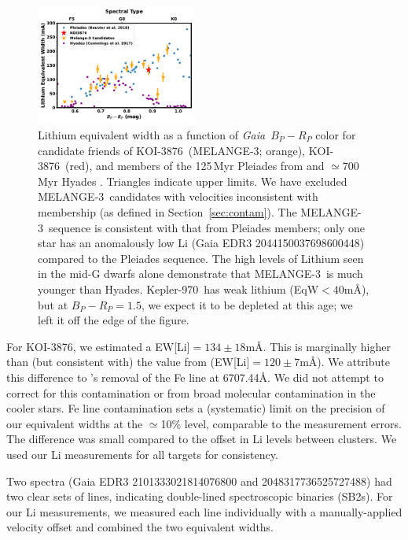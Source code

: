 \documentclass[twocolumn, linenumbers]{aastex631}
\newcommand{\association}{MELANGE-3}
\newcommand{\starname}{KOI-3876}
\newcommand{\starnametwo}{Kepler-970}
\newcommand{\gaia}{\textit{Gaia}}
\begin{document}
\begin{figure}[!t]
    \centering
    \includegraphics[width=0.47\textwidth]{lithium.pdf}
    \caption{Lithium equivalent width as a function of \gaia\ $B_P-R_P$ color for candidate friends of \starname\ (\association; orange), \starname\ (red), and members of the 125\,Myr Pleiades from \citet{2018A&A...613A..63B} and $\simeq$700\,Myr Hyades \citep{2017AJ....153..128C}. Triangles indicate upper limits. We have excluded \association\ candidates with velocities inconsistent with membership (as defined in Section~\ref{sec:contam}). The \association\ sequence is consistent with that from Pleiades members; only one star has an anomalously low Li (Gaia EDR3 2044150037698600448) compared to the Pleiades sequence. The high levels of Lithium seen in the mid-G dwarfs alone demonstrate that \association\ is much younger than Hyades. \starnametwo\ has weak lithium (EqW$<40$m\AA), but at $B_P-R_P=1.5$, we expect it to be depleted at this age; we left it off the edge of the figure.
    \label{fig:lithium}
    }
\end{figure}

For \starname, we estimated a EW[Li]$=134\pm18$m\AA. This is marginally higher than (but consistent with) the value from \citet{2018ApJ...855..115B} (EW[Li]$=120\pm7$m\AA). We attribute this difference to \citet{2018ApJ...855..115B}'s removal of the Fe line at 6707.44\AA. We did not attempt to correct for this contamination or from broad molecular contamination in the cooler stars. Fe line contamination sets a (systematic) limit on the precision of our equivalent widths at the $\simeq$10\% level, comparable to the measurement errors. The difference was small compared to the offset in Li levels between clusters. We used our Li measurements for all targets for consistency.

Two spectra (Gaia EDR3 2101333021814076800 and 2048317736525727488) had two clear sets of lines, indicating double-lined spectroscopic binaries (SB2s). For our Li measurements, we measured each line individually with a manually-applied velocity offset and combined the two equivalent widths. 
\end{document}
